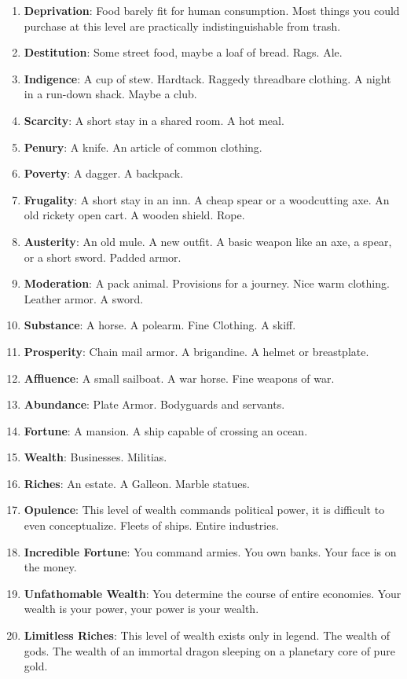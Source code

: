 \documentclass[
  letterpaper,
  DIV=11,
  numbers=noendperiod]{scrartcl}
\providecommand{\tightlist}{%
  \setlength{\itemsep}{0pt}\setlength{\parskip}{0pt}}\usepackage{longtable,booktabs,array}
\begin{document}
\begin{enumerate}
\def\labelenumi{\arabic{enumi}.}
\tightlist
\item
  \textbf{Deprivation}: Food barely fit for human consumption. Most
  things you could purchase at this level are practically
  indistinguishable from trash.
\item
  \textbf{Destitution}: Some street food, maybe a loaf of bread. Rags.
  Ale.
\item
  \textbf{Indigence}: A cup of stew. Hardtack. Raggedy threadbare
  clothing. A night in a run-down shack. Maybe a club.
\item
  \textbf{Scarcity}: A short stay in a shared room. A hot meal.
\item
  \textbf{Penury}: A knife. An article of common clothing.
\item
  \textbf{Poverty}: A dagger. A backpack.
\item
  \textbf{Frugality}: A short stay in an inn. A cheap spear or a
  woodcutting axe. An old rickety open cart. A wooden shield. Rope.
\item
  \textbf{Austerity}: An old mule. A new outfit. A basic weapon like an
  axe, a spear, or a short sword. Padded armor.
\item
  \textbf{Moderation}: A pack animal. Provisions for a journey. Nice
  warm clothing. Leather armor. A sword.
\item
  \textbf{Substance}: A horse. A polearm. Fine Clothing. A skiff.
\item
  \textbf{Prosperity}: Chain mail armor. A brigandine. A helmet or
  breastplate.
\item
  \textbf{Affluence}: A small sailboat. A war horse. Fine weapons of
  war.
\item
  \textbf{Abundance}: Plate Armor. Bodyguards and servants.
\item
  \textbf{Fortune}: A mansion. A ship capable of crossing an ocean.
\item
  \textbf{Wealth}: Businesses. Militias.
\item
  \textbf{Riches}: An estate. A Galleon. Marble statues.
\item
  \textbf{Opulence}: This level of wealth commands political power, it
  is difficult to even conceptualize. Fleets of ships. Entire
  industries.
\item
  \textbf{Incredible Fortune}: You command armies. You own banks. Your
  face is on the money.
\item
  \textbf{Unfathomable Wealth}: You determine the course of entire
  economies. Your wealth is your power, your power is your wealth.
\item
  \textbf{Limitless Riches}: This level of wealth exists only in legend.
  The wealth of gods. The wealth of an immortal dragon sleeping on a
  planetary core of pure gold.
\end{enumerate}
\end{document}
